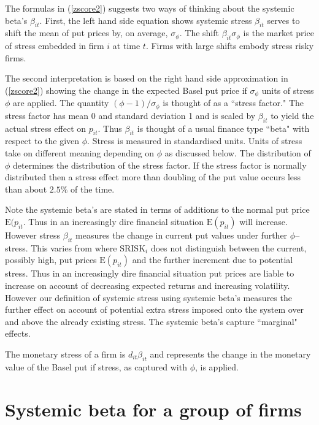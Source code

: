 \documentclass[authoryear]{elsarticle}
\newcommand{\E}{\mathrm{E}}
\newcommand{\eref}[1]{(\ref{#1})}
\begin{document}
The formulas in \eref{zscore2} suggests two ways of  thinking about the  systemic beta's  $\beta_{it}$.   First, the left hand side equation shows systemic stress $\beta_{it}$ serves to shift the mean of put prices  by, on average, $\sigma_\phi$.   The shift $\beta_{it}\sigma_\phi$ is the market price of stress embedded in firm $i$ at time $t$.   Firms with large shifts embody stress risky firms.

The second interpretation is based on  the right hand side approximation in \eref{zscore2} showing   the change in the  expected Basel put price if  $\sigma_\phi$ units of stress $\phi$ are applied.  The quantity $(\phi-1)/\sigma_\phi$ is thought of as a ``stress factor."   The stress factor has mean 0 and standard deviation 1 and is scaled by $\beta_{it}$ to yield the actual stress effect on  $p_{it}$.  Thus  $\beta_{it}$ is thought of a usual finance type ``beta" with respect to the given $\phi$.   Stress is measured in standardised units.  Units of stress take on different meaning depending on  $\phi$ as discussed below. The distribution of $\phi$ determines the distribution of the stress factor. If the stress factor is normally distributed then a stress effect more than doubling of the put value  occurs less than about $2.5\%$ of the time. 

Note the systemic beta's are stated in terms of additions to the normal put price $\E(p_{it}$. Thus in an increasingly dire financial situation $\E(p_{it})$ will increase.   However stress $\beta_{it}$ measures the  change in current put values  under  further $\phi$--stress.  This varies from  \cite{brownlees2015} where $\mathrm{SRISK}_i$ does not distinguish between the current, possibly high, put prices $\E(p_{it})$ and the further increment due to potential stress.   Thus in an increasingly dire financial situation put prices are liable to increase on account of decreasing expected returns and increasing volatility.   However our definition of systemic stress using systemic beta's measures the further effect on account of potential extra stress imposed onto the system over and above the already existing stress.   The systemic beta's capture   ``marginal" effects.        

The  monetary stress of a firm is 
$
d_{it}\beta_{it}
$
and represents the change in the monetary value of the Basel put  if stress, as captured with $\phi$, is applied. 





\section{Systemic beta for a group of firms}
\end{document}
